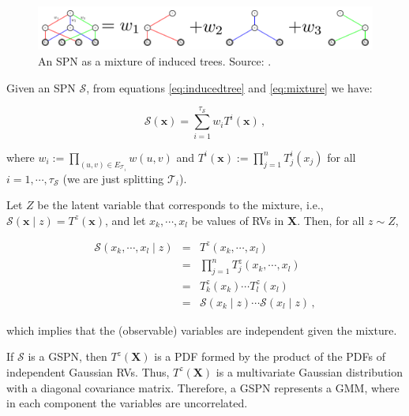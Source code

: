 \begin{figure}
  \includegraphics[width=\textwidth]{figures/inducedtrees.pdf}

  \caption[SPN as a mixture of induced trees]{An SPN as a mixture of induced trees. Source: \citet{Zhao2015}.}
  \label{fig:inducedtrees}
\end{figure}

\vspace{1em}

Given an SPN $\mathcal{S}$, from equations \ref{eq:inducedtree} and \ref{eq:mixture} we have:

\begin{equation}
  \label{eq:inducedtree_i}
  \mathcal{S}(\mathbf{x}) = \sum_{i=1}^{\tau_\mathcal{S}} w_i T^i(\textbf{x}) \, ,
\end{equation}

\noindent where $w_i := \prod_{(u, v) \in E_{\mathcal{T}_i}} w(u, v)$ and $T^i(\mathbf{x}) := \prod_{j=1}^n T^i_j(x_j)$ for all $i = 1, \cdots, \tau_\mathcal{S}$ (we are just splitting $\mathcal{T}_i$).

Let $Z$ be the latent variable that corresponds to the mixture, i.e., $\mathcal{S}(\mathbf{x} \mid z) = T^z(\textbf{x})$, and let $x_k, \cdots, x_l$ be values of RVs in $\mathbf{X}$. Then, for all $z \sim Z$,

\begin{eqnarray}
  \mathcal{S}(x_k, \cdots, x_l \mid z) & = & T^z(x_k, \cdots, x_l) \\
  & = & \prod_{j=1}^n T^z_j(x_k, \cdots, x_l) \\
  & = & T^z_k(x_k) \cdots T^z_l(x_l) \\
  & = & \mathcal{S}(x_k \mid z) \cdots \mathcal{S}(x_l \mid z) \, ,
\end{eqnarray}

\noindent which implies that the (observable) variables are independent given the mixture.

\vspace{1em}

If $\mathcal{S}$ is a GSPN, then $T^z(\mathbf{X})$ is a PDF formed by the product of the PDFs of independent Gaussian RVs. Thus, $T^z(\mathbf{X})$ is a multivariate Gaussian distribution with a diagonal covariance matrix. Therefore, a GSPN represents a GMM, where in each component the variables are uncorrelated.

